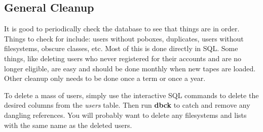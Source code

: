 \subsection{General Cleanup}

It is good to periodically check the database to see that things are
in order.  Things to check for include: users without poboxes,
duplicates, users without filesystems, obscure classes, etc.  Most of
this is done directly in SQL.  Some things, like deleting users who
never registered for their accounts and are no longer eligible, are
easy and should be done monthly when new tapes are loaded.  Other
cleanup only needs to be done once a term or once a year.

\label{deletingusers}
To delete a mass of users, simply use the interactive SQL commands to
delete the desired columns from the {\em users} table.  Then run
{\bf dbck} to catch and remove any dangling references.  You will
probably want to delete any filesystems and lists with the same name
as the deleted users.

